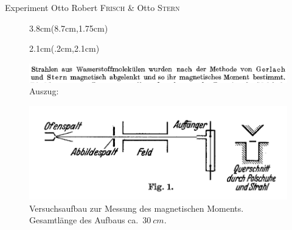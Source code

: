 \documentclass[t,9pt]{beamer}
\newcommand{\highlight}[3]{ \begin{textblock*}{#1}(#2,#3) \begin{tcolorbox} [enhanced,opacityfill=.1,colback=blue] \end{tcolorbox} \end{textblock*} } %
\begin{document}
        \begin{frame}{Experiment Otto Robert \textsc{Frisch} \& Otto \textsc{Stern}} 
                \begin{figure}
                        \highlight{3.8cm}{8.7cm}{1.75cm}
                        \highlight{2.1cm}{.2cm}{2.1cm}
                        \includegraphics[width=\textwidth]{prosi_nach_methode_stern_gerlach.png}
                        \caption{Auszug:\cite{FrischStern1933}}
                \end{figure} 
                \begin{figure}
                        \includegraphics[width=.8\textwidth]{prosi_versuchsaufbau_mag_moment.png}
                        \caption{Versuchsaufbau zur Messung des magnetischen Moments. Gesamtlänge des Aufbaus ca.\ $\SI{30}{cm}$.\cite{FrischStern1933}}
                \end{figure}
        \end{frame}
\end{document}
